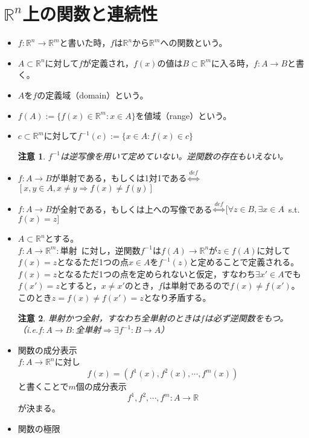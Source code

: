 \documentclass[dvipdfmx,a4j,10pt]{jsarticle}
\theoremstyle{mystyle1}
\theoremstyle{mystyle2}
\newtheorem{note}{注意}
\begin{document}
\section{$\mathbb{R}^n$上の関数と連続性}
\begin{itemize}
    \item $f:\mathbb{R}^n\to\mathbb{R}^m$と書いた時，$f$は$\mathbb{R}^n$から$\mathbb{R}^m$への関数という。
    \item $A\subset\mathbb{R}^n$に対して$f$が定義され，$f(x)$の値は$B\subset\mathbb{R}^m$に入る時，$f:A\to B$と書く。
    \item $A$を$f$の定義域（domain）という。
    \item $f(A):=\{f(x)\in\mathbb{R}^m:x\in A\}$を値域（range）という。
    \item $c\subset\mathbb{R}^m$に対して$f^{-1}(c):=\{x\in A:f(x)\in c\}$
    \begin{note}
        $f^{-1}$は逆写像を用いて定めていない。逆関数の存在もいえない。
    \end{note}
    \item $f:A\to B$が単射である，もしくは1対1である$\overset{def}{\Leftrightarrow}$$[x,y\in A,x\neq y \Rightarrow f(x)\neq f(y)]$
    \item $f:A\to B$が全射である，もしくは上への写像である$\overset{def}{\Leftrightarrow}$$[\forall z\in B,\exists x\in A$\ s.t.\ $f(x)=z]$
    \item $A\subset\mathbb{R}^n$とする。\\
    $f:A\to\mathbb{R}^m:$単射\ に対し，逆関数$f^{-1}$は$f(A)\to\mathbb{R}^n$が$z\in f(A)$に対して$f(x)=z$となるただ1つの点$x\in A$を$f^{-1}(z)$と定めることで定義される。\\
    $f(x)=z$となるただ1つの点を定められないと仮定，すなわち$\exists x'\in A$でも$f(x')=z$とすると，$x\neq x'$のとき，$f$は単射であるので$f(x)\neq f(x')$。このとき$z=f(x)\neq f(x')=z$となり矛盾する。
    \begin{note}
        単射かつ全射，すなわち全単射のときは$f$は必ず逆関数をもつ。\\（i.e.$f:A\to B:$全単射$\Rightarrow$$\exists f^{-1}:B\to A$）
    \end{note}
    \item 関数の成分表示\\
    $f:A\to\mathbb{R}^n$に対し
    \[
    f(x)=(f^1(x),f^2(x),\cdots,f^m(x))
    \]
    と書くことで$m$個の成分表示
    \[
    f^1,f^2,\cdots,f^m:A\to\mathbb{R}
    \]
    が決まる。
    \item 関数の極限\\

\end{itemize}
\end{document}
